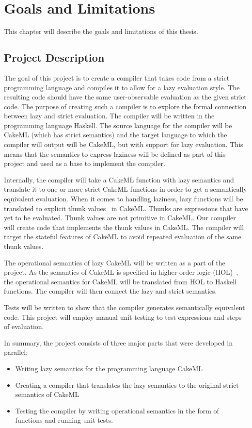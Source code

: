 \chapter{Goals and Limitations}
This chapter will describe the goals and limitations of this thesis.

\section{Project Description}
\label{intro:project}
The goal of this project is to create a compiler that takes code from a strict
programming language and compiles it to allow for a lazy evaluation style. The
resulting code should have the same user-observable evaluation as the given
strict code. The purpose of creating such a compiler is to explore the formal
connection between lazy and strict evaluation. The compiler will be written in
the programming language Haskell. The source language for the compiler will be
CakeML (which has strict semantics) and the target language to which the
compiler will output will be CakeML, but with support for lazy evaluation. This
means that the semantics to express laziness will be defined as part of this
project and used as a base to implement the compiler.

Internally, the compiler will take a
CakeML function with lazy semantics and translate it to one
or more strict CakeML functions in order to get a semantically equivalent
evaluation. When it comes to handling laziness, lazy functions will be
translated to explicit thunk values~\cite{Ingerman:1961:TWC:366062.366084} in
CakeML. Thunks are expressions that have yet to be evaluated. Thunk values are
not primitive in CakeML. Our compiler will create code that
implements the thunk values in CakeML. The compiler will target the stateful
features of CakeML to avoid repeated evaluation of the same thunk values.

The operational semantics of lazy CakeML will be written as a part of the
project. As the semantics of CakeML is specified in higher-order logic
(HOL)~\cite{HOLInter57:online},
the operational semantics for CakeML will be translated from HOL to Haskell
functions. The compiler will then connect the lazy and strict semantics.

Tests will be written to show that the compiler generates semantically
equivalent code. This project will employ manual unit testing to test
expressions and steps of evaluation.

In summary, the project consists of three major parts that were developed
in parallel:
\begin{itemize}
 \item Writing lazy semantics for the programming language CakeML
 \item Creating a compiler that translates the lazy semantics to the original strict semantics of CakeML
 \item Testing the compiler by writing operational semantics in the form of functions and running unit tests.
\end{itemize}

